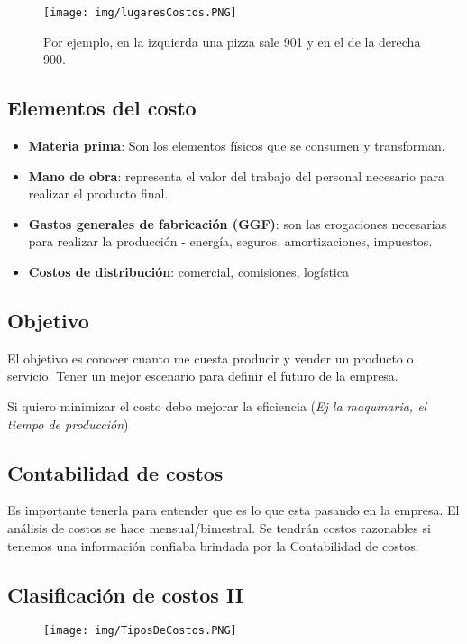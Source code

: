 \documentclass[titlepage,a4paper]{article}
\begin{document}
\begin{figure}[!htb]
    \centering
    \texttt{[image: img/lugaresCostos.PNG]}
    \caption{Por ejemplo, en la izquierda una pizza sale 901 y en el de la derecha 900.}
\end{figure}

\subsection*{Elementos del costo}
\begin{itemize}
\item \textbf{Materia prima}: Son los elementos físicos que se consumen y transforman.
\item \textbf{Mano de obra}: representa el valor del trabajo del personal necesario para realizar el producto final.
\item \textbf{Gastos generales de fabricación (GGF)}: son las erogaciones necesarias para realizar la producción - energía, seguros, amortizaciones, impuestos.
\item \textbf{Costos de distribución}: comercial, comisiones, logística
\end{itemize}


\subsection*{Objetivo}
El objetivo es conocer cuanto me cuesta producir y vender un producto o servicio. Tener un mejor escenario para definir el futuro de la empresa.

Si quiero minimizar el costo debo mejorar la eficiencia (\textit{Ej la maquinaria, el tiempo de producción})

\subsection*{Contabilidad de costos}
Es importante tenerla para entender que es lo que esta pasando en la empresa.
El análisis de costos se hace mensual/bimestral.
Se tendrán costos razonables si tenemos una información confiaba brindada por la Contabilidad de costos.

\newpage
\subsection*{Clasificación de costos II}

\begin{figure}[!htb]
    \centering
    \texttt{[image: img/TiposDeCostos.PNG]}
\end{figure}
\end{document}
